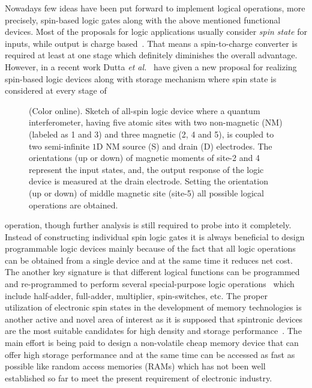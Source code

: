 \documentclass[doublecol]{epl2}
\begin{document}
Nowadays few ideas have been put forward to implement logical operations,
more precisely, spin-based logic gates along with the above mentioned 
functional devices. Most of the proposals for logic applications usually 
consider {\em spin state} for inputs, while output is charge 
based~\cite{LGS1,LGS2,LGS3,LGS4}. That means a spin-to-charge converter is 
required at least at one stage which definitely diminishes the overall 
advantage. However, in a recent work Dutta {\em et al.}~\cite{LGS5} have 
given a new proposal for realizing spin-based logic devices along with 
storage mechanism where spin state is considered at every stage of 
\begin{figure}[ht]
{\centering {}\par}
\caption{(Color online). Sketch of all-spin logic device where a quantum 
interferometer, having five atomic sites with two non-magnetic (NM) (labeled 
as 1 and 3) and three magnetic (2, 4 and 5), is coupled to two semi-infinite 
$1$D NM source (S) and drain (D) electrodes. The orientations (up or down) 
of magnetic moments of site-2 and 4 represent the input states, and, the 
output response of the logic device is measured at the drain electrode. 
Setting the orientation (up or down) of middle magnetic site (site-5) all 
possible logical operations are obtained.}
\label{f0}
\end{figure}
operation, though
further analysis is still required to probe into it completely. Instead of
constructing individual spin logic gates it is always beneficial to design
programmable logic devices mainly because of the fact that all logic
operations can be obtained from a single device and at the same time it
reduces net cost. The another key signature is that different logical 
functions can be programmed and re-programmed to perform several 
special-purpose logic operations~\cite{LGS1,plg1,plg2,plg3} which include 
half-adder, full-adder, multiplier, spin-switches, etc. The proper 
utilization of electronic spin states in the development of memory 
technologies is another active and novel area of interest as it is supposed 
that spintronic devices are the most suitable candidates for high density 
and storage performance~\cite{LGS2,LGS5,s1,plg1,mem1}. The main effort is 
being paid to design a non-volatile cheap memory device that can offer high 
storage performance and at the same time can be accessed as fast as possible 
like random access memories (RAMs) which has not been well established so 
far to meet the present requirement of electronic industry.
\end{document}
